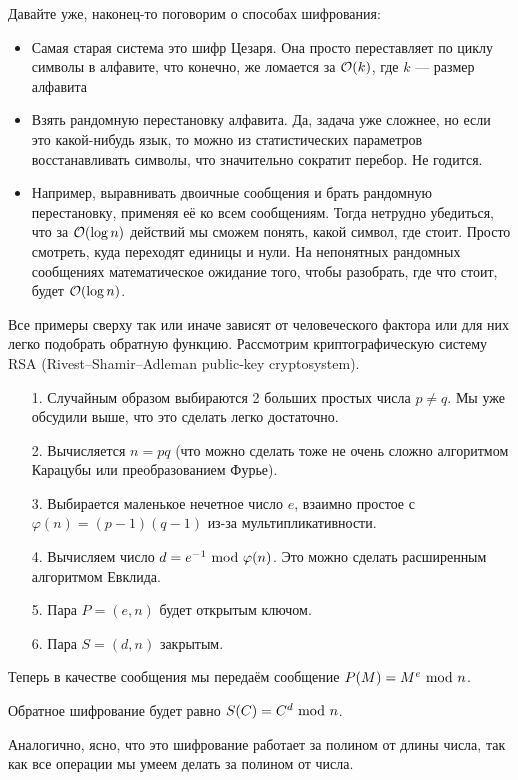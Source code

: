 \documentclass[a4paper, 12pt]{article}
\begin{document}
Давайте уже, наконец-то поговорим о способах шифрования:

\begin{itemize}
  \item Самая старая система это шифр Цезаря. Она просто переставляет по циклу
  символы в алфавите, что конечно, же ломается за $\mathcal{O}(k)$, где $k$ --- размер
  алфавита
  \item Взять рандомную перестановку алфавита. Да, задача уже сложнее, но
  если это какой-нибудь язык, то можно из статистических параметров
  восстанавливать символы, что значительно сократит перебор. Не годится.
  \item Например, выравнивать двоичные сообщения и брать рандомную перестановку,
  применяя её ко всем сообщениям. Тогда нетрудно убедиться, что за $\mathcal{O}(\log n)$
  действий мы сможем понять, какой символ, где стоит. Просто смотреть, куда
  переходят единицы и нули. На непонятных рандомных сообщениях математическое
  ожидание того, чтобы разобрать, где что стоит, будет $\mathcal{O}(\log n)$.
\end{itemize}

Все примеры сверху так или иначе зависят от человеческого фактора или
для них легко подобрать обратную функцию. Рассмотрим криптографическую систему
RSA (Rivest--Shamir--Adleman public-key cryptosystem).

\begin{itemize}
  \item[1.] Случайным образом выбираются 2 больших простых числа $p \neq q$. Мы
  уже обсудили выше, что это сделать легко достаточно.
  \item[2.] Вычисляется $n = pq$ (что можно сделать тоже не очень сложно
  алгоритмом Карацубы или преобразованием Фурье).
  \item[3.] Выбирается маленькое нечетное число $e$, взаимно простое с 
  $\varphi(n) = (p - 1)(q - 1)$ из-за мультипликативности.
  \item[4.] Вычисляем число $d = e^{-1} \ \text{mod} \  \varphi(n)$. Это можно сделать
  расширенным алгоритмом Евклида.
  \item[5.] Пара $P = (e, n)$ будет открытым ключом.
  \item[6.] Пара $S = (d, n)$ закрытым.
\end{itemize}

Теперь в качестве сообщения мы передаём сообщение $P(M) = M^{e} \ \text{mod} \  n$.

Обратное шифрование будет равно $S(C) = C^{d} \ \text{mod} \  n$.

Аналогично, ясно, что это шифрование работает за полином от длины числа, так
как все операции мы умеем делать за полином от числа.
\end{document}
